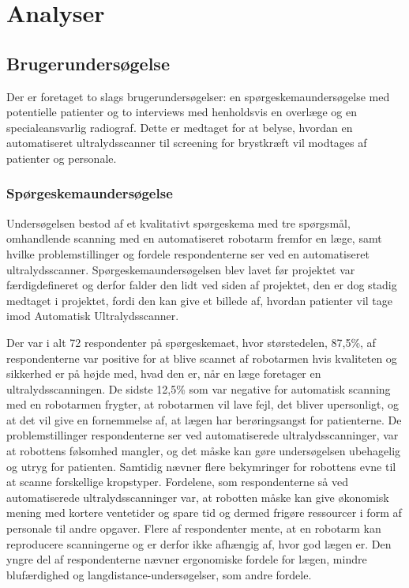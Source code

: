 \chapter{Analyser}\label{Analyser}

\section{Brugerundersøgelse}
Der er foretaget to slags brugerundersøgelser: en spørgeskemaundersøgelse med potentielle patienter og to interviews med henholdsvis en overlæge og en specialeansvarlig radiograf. Dette er medtaget for at belyse, hvordan en automatiseret ultralydsscanner til screening for brystkræft vil modtages af patienter og personale. 

\subsection{Spørgeskemaundersøgelse}
Undersøgelsen bestod af et kvalitativt spørgeskema med tre spørgsmål, omhandlende scanning med en automatiseret robotarm fremfor en læge, samt hvilke problemstillinger og fordele respondenterne ser ved en automatiseret ultralydsscanner. Spørgeskemaundersøgelsen blev lavet før projektet var færdigdefineret og derfor falder den lidt ved siden af projektet, den er dog stadig medtaget i projektet, fordi den kan give et billede af, hvordan patienter vil tage imod Automatisk Ultralydsscanner.  

Der var i alt 72 respondenter på spørgeskemaet, hvor størstedelen, 87,5\%, af respondenterne var positive for at blive scannet af robotarmen hvis kvaliteten og sikkerhed er på højde med, hvad den er, når en læge foretager en ultralydsscanningen. De sidste 12,5\% som var negative for automatisk scanning med en robotarmen frygter, at robotarmen vil lave fejl, det bliver upersonligt, og at det vil give en fornemmelse af, at lægen har berøringsangst for patienterne. 
De problemstillinger respondenterne ser ved automatiserede ultralydsscanninger, var at robottens følsomhed mangler, og det måske kan gøre undersøgelsen ubehagelig og utryg for patienten. Samtidig nævner flere bekymringer for robottens evne til at scanne forskellige kropstyper. Fordelene, som respondenterne så ved automatiserede ultralydsscanninger var, at robotten måske kan give økonomisk mening med kortere ventetider og spare tid og dermed frigøre ressourcer i form af personale til andre opgaver. Flere af respondenter mente, at en robotarm kan reproducere scanningerne og er derfor ikke afhængig af, hvor god lægen er. Den yngre del af respondenterne nævner ergonomiske fordele for lægen, mindre blufærdighed og langdistance-undersøgelser, som andre fordele. 

